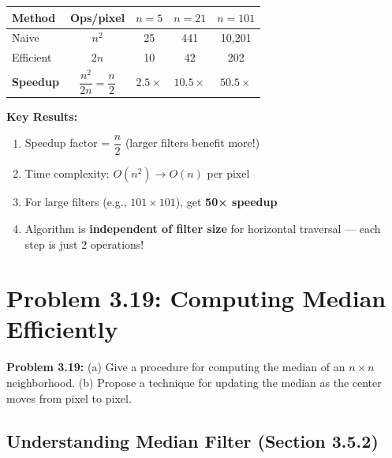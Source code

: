 \documentclass[12pt,a4paper]{article}
\begin{document}
\begin{center}
\renewcommand{\arraystretch}{1.3}
\begin{tabular}{|l|c|c|c|c|}
\hline
\textbf{Method} & \textbf{Ops/pixel} & $n=5$ & $n=21$ & $n=101$ \\
\hline
Naive & $n^2$ & 25 & 441 & 10,201 \\
Efficient & $2n$ & 10 & 42 & 202 \\
\hline
\textbf{Speedup} & $\dfrac{n^2}{2n} = \dfrac{n}{2}$ & $\mathbf{2.5\times}$ & $\mathbf{10.5\times}$ & $\mathbf{50.5\times}$ \\
\hline
\end{tabular}
\end{center}

\begin{keypoint}
\textbf{Key Results:}
\begin{enumerate}
    \item Speedup factor = $\dfrac{n}{2}$ (larger filters benefit more!)
    \item Time complexity: $O(n^2) \rightarrow O(n)$ per pixel
    \item For large filters (e.g., $101 \times 101$), get \textbf{50× speedup}
    \item Algorithm is \textbf{independent of filter size} for horizontal traversal --- each step is just 2 operations!
\end{enumerate}
\end{keypoint}

\newpage
\section{Problem 3.19: Computing Median Efficiently}

\begin{questionbox}
\textbf{Problem 3.19:} (a) Give a procedure for computing the median of an $n \times n$ neighborhood. (b) Propose a technique for updating the median as the center moves from pixel to pixel.
\end{questionbox}

\subsection{Understanding Median Filter (Section 3.5.2)}
\end{document}
